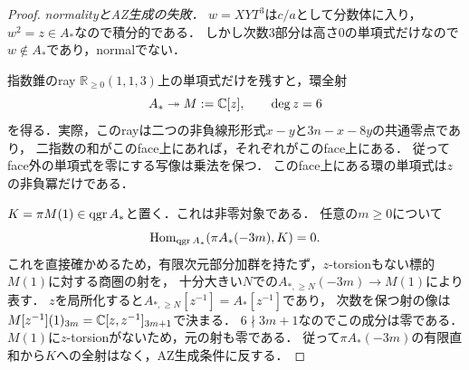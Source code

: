 \documentclass[11pt,a4paper]{ltjsarticle}
\begin{document}
\begin{proof}
\emph{normalityとAZ生成の失敗．}
$w=XYT^3$は$c/a$として分数体に入り，$w^2=z\in A_*$なので積分的である．
しかし次数3部分は高さ0の単項式だけなので$w\notin A_*$であり，normalでない．

指数錐のray $\mathbb R_{\geq0}(1,1,3)$上の単項式だけを残すと，環全射
\[
 A_*\twoheadrightarrow M:=\mathbb C[z],\qquad \deg z=6
\]
を得る．実際，このrayは二つの非負線形形式$x-y$と$3n-x-8y$の共通零点であり，
二指数の和がこのface上にあれば，それぞれがこのface上にある．
従ってface外の単項式を零にする写像は乗法を保つ．
このface上にある環の単項式は$z$の非負冪だけである．

$K=\pi M(1)\in\operatorname{qgr} A_*$と置く．これは非零対象である．
任意の$m\geq0$について
\[
 \operatorname{Hom}_{\operatorname{qgr} A_*}(\pi A_*(-3m),K)=0.
\]
これを直接確かめるため，有限次元部分加群を持たず，$z$-torsionもない標的$M(1)$に対する商圏の射を，
十分大きい$N$での$A_{*,\geq N}(-3m)\to M(1)$により表す．
$z$を局所化すると$A_{*,\geq N}[z^{-1}]=A_*[z^{-1}]$であり，
次数を保つ射の像は$M[z^{-1}](1)_{3m}=\mathbb C[z,z^{-1}]_{3m+1}$で決まる．
$6\nmid3m+1$なのでこの成分は零である．
$M(1)$に$z$-torsionがないため，元の射も零である．
従って$\pi A_*(-3m)$の有限直和から$K$への全射はなく，AZ生成条件に反する．
\end{proof}
\end{document}
